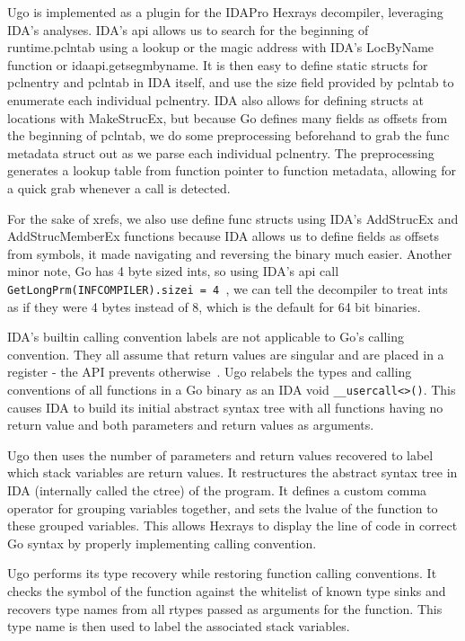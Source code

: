 \documentclass[letterpaper,twocolumn,10pt]{article}
\begin{document}
    Ugo is implemented as a plugin for the IDAPro Hexrays decompiler, leveraging IDA’s analyses. IDA’s api allows us to search for the beginning of runtime.pclntab using a lookup or the magic address with IDA’s LocByName function or idaapi.get\-segm\-by\-name. It is then easy to define static structs for pclnentry and pclntab in IDA itself, and use the size field provided by pclntab to enumerate each individual pclnentry. IDA also allows for defining structs at locations with MakeStrucEx, but because Go defines many fields as offsets from the beginning of pclntab, we do some preprocessing beforehand to grab the \-func metadata struct out as we parse each individual pclnentry. The preprocessing generates a lookup table from function pointer to function metadata, allowing for a quick grab whenever a call is detected.

    For the sake of xrefs, we also use define \-func structs using IDA’s AddStrucEx and AddStrucMemberEx functions because IDA allows us to define fields as offsets from symbols, it made navigating and reversing the binary much easier. Another minor note, Go has 4 byte sized ints, so using IDA’s api call \texttt{GetLongPrm(INF\-COMPILER).size\-i = 4 }, we can tell the decompiler to treat ints as if they were 4 bytes instead of 8, which is the default for 64 bit binaries.

    IDA’s builtin calling convention labels are not applicable to Go’s calling convention. They all assume that return values are singular and are placed in a register - the API prevents otherwise~\cite{settype}. Ugo relabels the types and calling conventions of all functions in a Go binary as an IDA void \texttt{\_\_usercall<>()}. This causes IDA to build its initial abstract syntax tree with all functions having no return value and both parameters and return values as arguments.

    Ugo then uses the number of parameters and return values recovered to label which stack variables are return values. It restructures the abstract syntax tree in IDA (internally called the ctree) of the program. It defines a custom comma operator for grouping variables together, and sets the lvalue of the function to these grouped variables. This allows Hexrays to display the line of code in correct Go syntax by properly implementing calling convention.

    Ugo performs its type recovery while restoring function calling conventions. It checks the symbol of the function against the whitelist of known type sinks and recovers type names from all rtypes passed as arguments for the function. This type name is then used to label the associated stack variables.
\end{document}
